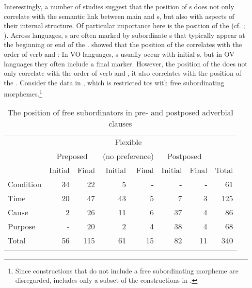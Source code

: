 \documentclass[output=paper]{langsci/langscibook}
\begin{document}
Interestingly, a number of studies suggest that the position of s does not only correlate with the semantic link between main and s, but also with aspects of their internal structure. Of particular importance here is the position of the  (cf. \citealt{Diessel2001}; \citealt{Schmidtke-Bode2009,Hetterle2015}). Across languages, s are often marked by subordinate s that typically appear at the beginning or end of the . \citet{Dryer1992} showed that the position of the  correlates with the order of verb and : In VO languages, s usually occur with initial s, but in OV languages they often include a final marker. However, the position of the  does not only correlate with the order of verb and , it also correlates with the position of the . Consider the data in , which is restricted tos with free subordinating morphemes.\footnote{Since  constructions that do not include a free subordinating morpheme are disregarded,  includes only a subset of the  constructions in .} 

\begin{table}
\begin{tabularx}{\textwidth}{X rr  rr rr  r}
\lsptoprule
& & & \multicolumn{2}{c}{Flexible}\\
& \multicolumn{2}{c}{Preposed} &  \multicolumn{2}{c}{(no preference)} &  \multicolumn{2}{c}{Postposed} \\
\cmidrule(lr){2-3}\cmidrule(lr){4-5}\cmidrule(lr){6-7}
&   Initial &   Final &   Initial &   Final &   Initial &   Final & Total\\
\midrule
{Condition} 	& 34 	& 22 	& 5 	& - 	& - 	& - 	& 61\\
{Time} 		& 20 	& 47 	& 43 	& 5 	& 7 	& 3 	& 125\\
{Cause} 	& 2 	& 26 	& 11 	& 6 	& 37 	& 4 	& 86\\
{Purpose} 	& - 	& 20 	& 2 	& 4 	& 38 	& 4 	& 68\\
\midrule
{Total} 	& 56 	& 115 	& 61 	& 15 	& 82 	& 11 	& 340\\
\lspbottomrule
\end{tabularx}

\caption{The position of free subordinators in pre- and postposed adverbial clauses}
\label{tab:diessel:3}
\end{table}
\end{document}
